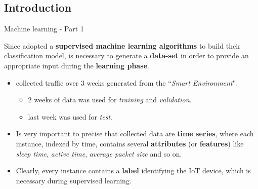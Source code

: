 \documentclass[13.5pt]{beamer}
\begin{document}
\subsection{Introduction}
\begin{frame}{Machine learning - Part 1}

\begin{block}{}
\justifying
Since \citet{ITPAReport} adopted a \textbf{supervised machine learning algorithms} to build their classification model, is necessary to generate a \textbf{data-set} in order to provide an appropriate input during the \textbf{learning phase}.
\end{block}

\begin{itemize}
\justifying
\item \citet{ITPAReport} collected traffic over $3$ weeks generated from the ``\textit{Smart Environment}".
\begin{itemize}
\item 2 weeks of data was used for \textit{training} and \textit{validation}.
\item last week was used for \textit{test}.
\end{itemize}

\item Is very important to precise that collected data are \textbf{time series}, where each instance, indexed by time, contains several \textbf{attributes} (or \textbf{features}) like \textit{sleep time}, \textit{active time}, \textit{average packet size} and so on.

\item Clearly, every instance contains a \textbf{label} identifying the IoT device, which is necessary during supervised learning.
\end{itemize}

\end{frame} 
\end{document}
